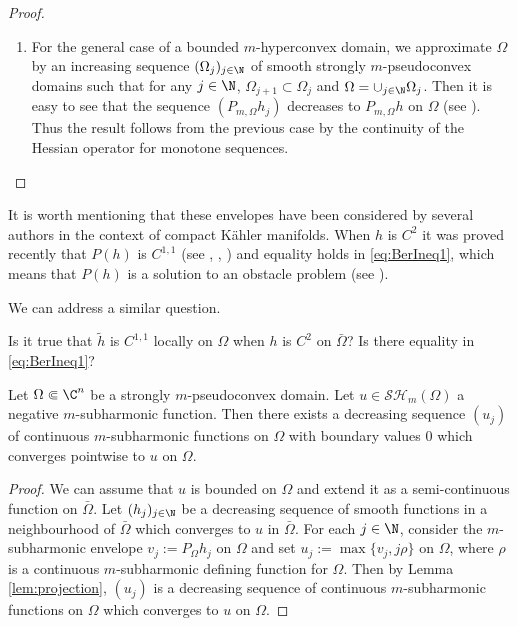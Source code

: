 \begin{proof}
\begin{enumerate}
Summarizing, we have proved that for any $j \in \N$, $\psi_j \leq u_j \leq \tilde h $ on $\Omega$.
Therefore,
\[
0 \leq \tilde h - u_j \leq \tilde h - \psi_j = (1 \slash j) ( \tilde h - \psi + m \log j)\quad\text{on $\Omega$ for any $j \in \N^*$}.
\]
This proves that $u_j$ converges to $\tilde h$ uniformly on $\Omega$. Then since $u_j \leq h$ on $\Omega$, taking the limit as $j \to + \infty$ in \eqref{eq:BerEqu} we obtain inequality \eqref{eq:BerIneq2} by the continuity of the Hessian operators for uniform convergence (see \cite{Lu12}).

\item
For the general case of a bounded $m$-hyperconvex domain, we approximate $\Omega$ by an increasing sequence $(\Omega_j)_{j \in \N}$ of smooth strongly $m$-pseudoconvex domains such that for any $j \in \N$, $\Omega_{j + 1} \subset \Omega_j$ and $\Omega = \cup_{j \in \N} \Omega_j$.
Then it is easy to see that the sequence $(P_{m,\Omega} h_j)$ decreases to $P_{m,\Omega} h$ on $\Omega$ (see \cite{GLZ19}). Thus the result follows from the previous case by the continuity of the Hessian operator for monotone sequences.\qedhere
\end{enumerate}
\end{proof}

It is worth mentioning that these envelopes have been considered by several authors in the context of compact Kähler manifolds. When $h$ is $C^2$ it was proved recently that $P (h)$ is $C^{1,1}$ (see \cite{ChZh17}, \cite{T18}, \cite{Ber19}) and equality holds in \eqref{eq:BerIneq1}, which means that $P(h)$ is a solution to an obstacle problem (see \cite{BD12}).

We can address a similar question.

\begin{Question}
Is it true that $\tilde h$ is $C^{1,1}$ locally on $\Omega$ when $h$ is $C^2$ on $\bar \Omega$? Is there equality in \eqref{eq:BerIneq1}?
\end{Question}

\begin{corollary} \label{cor:smoothing} Let $\Omega \Subset \C^n$ be a strongly $m$-pseudoconvex domain. Let $u \in \mathcal {SH}_m (\Omega)$ a negative $m$-subharmonic function. Then there exists a decreasing sequence $(u_j)$ of continuous $m$-subharmonic functions on $\Omega$ with boundary values $0$ which converges pointwise to $u$ on $\Omega$.
\end{corollary}

\begin{proof} We can assume that $u$ is bounded on $\Omega$ and extend it as a semi-continuous function on $\bar \Omega$. Let $(h_j)_{j \in \N}$ be a decreasing sequence of smooth functions in a neighbourhood of $\bar \Omega$ which converges to $u$ in $\bar \Omega$.
For each $j \in \N$, consider the $m$-subharmonic envelope
$v_j:= P_{\Omega} h_j$ on $\Omega$ and set $u_j:= \max \{v_j, j \rho\}$ on $\Omega$, where $\rho$ is a continuous $m$-subharmonic defining function for $\Omega$. Then by Lemma \ref{lem:projection}, $(u_j)$ is a decreasing sequence of continuous $m$-subharmonic functions on $\Omega$ which converges to $u$ on $\Omega$.
\end{proof}

